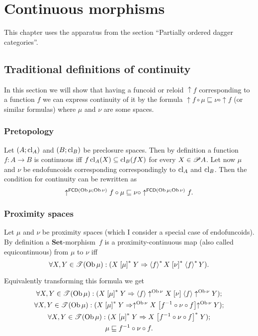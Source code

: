 
\chapter{Continuous morphisms}

This chapter uses the apparatus from the section ``Partially ordered
dagger categories''.


\section{Traditional definitions of continuity}

In this section we will show that having a funcoid or reloid $\uparrow f$
corresponding to a function $f$ we can express continuity of it by
the formula $\uparrow f\circ\mu\sqsubseteq\nu\circ\uparrow f$ (or
similar formulas) where $\mu$ and $\nu$ are some spaces.


\subsection{Pretopology}

Let $(A;\operatorname{cl}_{A})$ and $(B;\operatorname{cl}_{B})$ be preclosure spaces. Then by
definition a function $f:A\rightarrow B$ is continuous iff $f\operatorname{cl}_{A}(X)\subseteq\operatorname{cl}_{B}(fX)$
for every $X\in\mathscr{P} A$. Let now $\mu$ and $\nu$ be endofuncoids
corresponding correspondingly to $\operatorname{cl}_{A}$ and $\operatorname{cl}_{B}$. Then the
condition for continuity can be rewritten as
\[
\uparrow^{\mathsf{FCD}(\operatorname{Ob}\mu;\operatorname{Ob}\nu)}f\circ\mu\sqsubseteq\nu\circ\uparrow^{\mathsf{FCD}(\operatorname{Ob}\mu;\operatorname{Ob}\nu)}f.
\]



\subsection{Proximity spaces}

Let $\mu$ and $\nu$ be proximity spaces (which I consider a special
case of endofuncoids). By definition a $\mathbf{Set}$-morphism~$f$
is a proximity-continuous map (also called equicontinuous) from $\mu$
to $\nu$ iff
\[
\forall X,Y\in\mathscr{T}(\operatorname{Ob}\mu):(X\mathrel{\left[\mu\right]^{\ast}}Y\Rightarrow\left\langle f\right\rangle ^{\ast}X\mathrel{\left[\nu\right]^{\ast}}\left\langle f\right\rangle ^{\ast}Y).
\]


Equivalently transforming this formula we get
\begin{gather*}
\forall X,Y\in\mathscr{T}(\operatorname{Ob}\mu):(X\mathrel{\left[\mu\right]^{\ast}}Y\Rightarrow\left\langle f\right\rangle\uparrow^{\operatorname{Ob}\nu}X\mathrel{\left[\nu\right]}\left\langle f\right\rangle\uparrow^{\operatorname{Ob}\nu}Y);\\
\forall X,Y\in\mathscr{T}(\operatorname{Ob}\mu):(X\mathrel{\left[\mu\right]^{\ast}}Y\Rightarrow\uparrow^{\operatorname{Ob}\nu}X\mathrel{\left[f^{-1}\circ\nu\circ f\right]}\uparrow^{\operatorname{Ob}\nu}Y);\\
\forall X,Y\in\mathscr{T}(\operatorname{Ob}\mu):(X\mathrel{\left[\mu\right]^{\ast}}Y\Rightarrow X\mathrel{\left[f^{-1}\circ\nu\circ f\right]^{\ast}}Y);\\
\mu\sqsubseteq f^{-1}\circ\nu\circ f.
\end{gather*}


